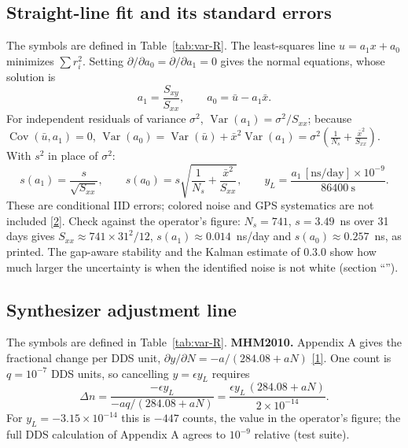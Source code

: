 \documentclass[11pt,a4paper]{article}
\newcommand{\manual}{\href{https://www.gb.nrao.edu/~fghigo/timer/MSMmaser/Maser_UG_75666-201_Rev_J.PDF}{[1]}}
\newcommand{\nist}{\href{https://tf.nist.gov/general/pdf/2220.pdf}{[2]}}
\renewcommand{\_}{\usscore\allowbreak}
\begin{document}
\subsection{Straight-line fit and its standard errors}
The symbols are defined in Table~\ref{tab:var-R}. The least-squares line \(u=a_1x+a_0\) minimizes \(\sum r_i^2\). Setting
$\partial/\partial a_0=\partial/\partial a_1=0$ gives the normal equations, whose solution is
\begin{equation}
a_1=\frac{S_{xy}}{S_{xx}},\qquad a_0=\bar u-a_1\bar x . \tag{R2}\label{eq:R2}
\end{equation}
For independent residuals of variance $\sigma^2$, $\operatorname{Var}(a_1)=\sigma^2/S_{xx}$;
because $\operatorname{Cov}(\bar u,a_1)=0$,
$\operatorname{Var}(a_0)=\operatorname{Var}(\bar u)+\bar x^2\operatorname{Var}(a_1)
=\sigma^2\left(\frac1{N_s}+\frac{\bar x^2}{S_{xx}}\right)$. With $s^2$ in place of $\sigma^2$:
\begin{equation}
s(a_1)=\frac{s}{\sqrt{S_{xx}}},\qquad s(a_0)=s\sqrt{\frac1{N_s}+\frac{\bar x^2}{S_{xx}}},\qquad
y_L=\frac{a_1\,[\mathrm{ns/day}]\times10^{-9}}{86400\ \mathrm{s}} . \tag{R3}\label{eq:R3}
\end{equation}
These are conditional IID errors; colored noise and GPS systematics are not included \nist.
Check against the operator's figure: $N_s=741$, $s=3.49$~ns over 31 days gives
$S_{xx}\approx741\times31^2/12$, $s(a_1)\approx0.014$~ns/day and $s(a_0)\approx0.257$~ns, as printed.
The gap-aware stability and the Kalman estimate of 0.3.0 show how much larger the uncertainty is
when the identified noise is not white (section ``'').

\subsection{Synthesizer adjustment line}
The symbols are defined in Table~\ref{tab:var-R}.
\textbf{MHM2010.} Appendix A gives the fractional change per DDS unit,
$\partial y/\partial N=-a/(284.08+aN)$ \manual. One count is $q=10^{-7}$ DDS units, so cancelling
$y=\epsilon y_L$ requires
\begin{equation}
\Delta n=\frac{-\epsilon y_L}{-aq/(284.08+aN)}
=\frac{\epsilon y_L\,(284.08+aN)}{2\times10^{-14}} . \tag{R4}\label{eq:R4}
\end{equation}
For $y_L=-3.15\times10^{-14}$ this is $-447$ counts, the value in the operator's figure; the
full DDS calculation of Appendix A agrees to $10^{-9}$ relative (test suite).
\end{document}
